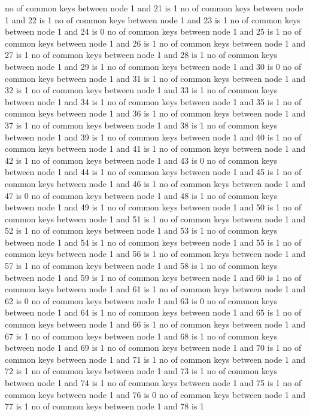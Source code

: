 no of common keys between node 1 and 21 is 1
no of common keys between node 1 and 22 is 1
no of common keys between node 1 and 23 is 1
no of common keys between node 1 and 24 is 0
no of common keys between node 1 and 25 is 1
no of common keys between node 1 and 26 is 1
no of common keys between node 1 and 27 is 1
no of common keys between node 1 and 28 is 1
no of common keys between node 1 and 29 is 1
no of common keys between node 1 and 30 is 0
no of common keys between node 1 and 31 is 1
no of common keys between node 1 and 32 is 1
no of common keys between node 1 and 33 is 1
no of common keys between node 1 and 34 is 1
no of common keys between node 1 and 35 is 1
no of common keys between node 1 and 36 is 1
no of common keys between node 1 and 37 is 1
no of common keys between node 1 and 38 is 1
no of common keys between node 1 and 39 is 1
no of common keys between node 1 and 40 is 1
no of common keys between node 1 and 41 is 1
no of common keys between node 1 and 42 is 1
no of common keys between node 1 and 43 is 0
no of common keys between node 1 and 44 is 1
no of common keys between node 1 and 45 is 1
no of common keys between node 1 and 46 is 1
no of common keys between node 1 and 47 is 0
no of common keys between node 1 and 48 is 1
no of common keys between node 1 and 49 is 1
no of common keys between node 1 and 50 is 1
no of common keys between node 1 and 51 is 1
no of common keys between node 1 and 52 is 1
no of common keys between node 1 and 53 is 1
no of common keys between node 1 and 54 is 1
no of common keys between node 1 and 55 is 1
no of common keys between node 1 and 56 is 1
no of common keys between node 1 and 57 is 1
no of common keys between node 1 and 58 is 1
no of common keys between node 1 and 59 is 1
no of common keys between node 1 and 60 is 1
no of common keys between node 1 and 61 is 1
no of common keys between node 1 and 62 is 0
no of common keys between node 1 and 63 is 0
no of common keys between node 1 and 64 is 1
no of common keys between node 1 and 65 is 1
no of common keys between node 1 and 66 is 1
no of common keys between node 1 and 67 is 1
no of common keys between node 1 and 68 is 1
no of common keys between node 1 and 69 is 1
no of common keys between node 1 and 70 is 1
no of common keys between node 1 and 71 is 1
no of common keys between node 1 and 72 is 1
no of common keys between node 1 and 73 is 1
no of common keys between node 1 and 74 is 1
no of common keys between node 1 and 75 is 1
no of common keys between node 1 and 76 is 0
no of common keys between node 1 and 77 is 1
no of common keys between node 1 and 78 is 1
